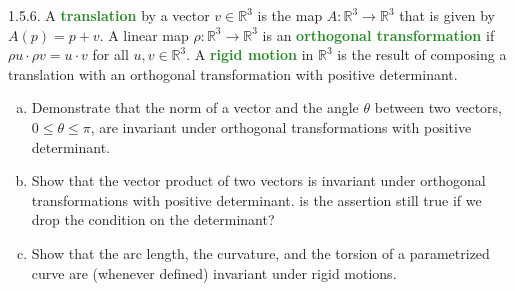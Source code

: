 \documentclass[11pt]{scrartcl}
\providecommand{\RR}{\mathbb R}
\providecommand{\ii}{\item}
\providecommand{\vocab}[1]{{\textbf{\textcolor{ForestGreen}{#1}}}}
\begin{document}
\begin{problem*}1.5.6.
	A \vocab{translation} by a vector $v\in\RR^3$ is the map
	$A\colon\RR^3\to\RR^3$ that is given by $A(p) = p + v$.
	A linear map $\rho\colon\RR^3\to\RR^3$ is an
	\vocab{orthogonal transformation} if $\rho u\cdot\rho v = u\cdot v$
	for all $u,v\in\RR^3$. A \vocab{rigid motion} in $\RR^3$ is
	the result of composing a translation with an orthogonal transformation
	with positive determinant.
	\begin{enumerate}[(a)]
		\ii Demonstrate that the norm of a vector
		and the angle $\theta$ between two vectors, $0\le \theta\le\pi$,
		are invariant under orthogonal transformations with
		positive determinant.
		\ii Show that the vector product of two vectors is invariant under
		orthogonal transformations with positive determinant.
		is the assertion still true if we drop the condition
		on the determinant?
		\ii Show that the arc length, the curvature, and the torsion
		of a parametrized curve are (whenever defined)
		invariant under rigid motions.
	\end{enumerate}
\end{problem*}
\end{document}
